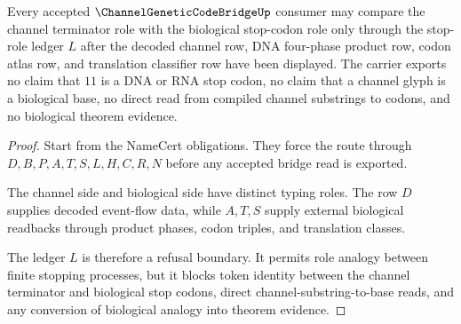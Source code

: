 \begin{theorem}
\label{thm:channel-genetic-code-bridge-stop-role-nonescape}
Every accepted $\ChannelGeneticCodeBridgeUp$ consumer may compare the channel terminator role with the biological stop-codon role only through the stop-role ledger $L$ after the decoded channel row, DNA four-phase product row, codon atlas row, and translation classifier row have been displayed. The carrier exports no claim that $11$ is a DNA or RNA stop codon, no claim that a channel glyph is a biological base, no direct read from compiled channel substrings to codons, and no biological theorem evidence.
\end{theorem}
\begin{proof}
Start from the NameCert obligations. They force the route through $D,B,P,A,T,S,L,H,C,R,N$ before any accepted bridge read is exported.

The channel side and biological side have distinct typing roles. The row $D$ supplies decoded event-flow data, while $A,T,S$ supply external biological readbacks through product phases, codon triples, and translation classes.

The ledger $L$ is therefore a refusal boundary. It permits role analogy between finite stopping processes, but it blocks token identity between the channel terminator and biological stop codons, direct channel-substring-to-base reads, and any conversion of biological analogy into theorem evidence.
\end{proof}




